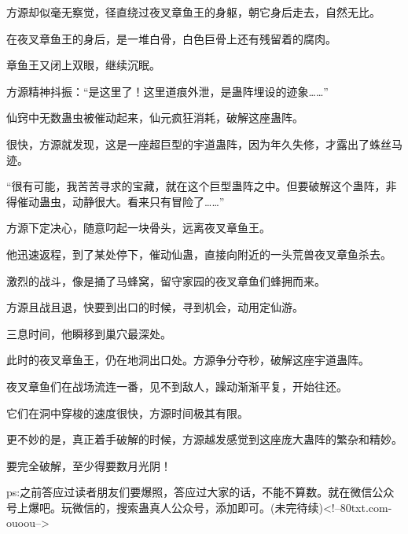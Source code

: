 \begin{this_body}
方源却似毫无察觉，径直绕过夜叉章鱼王的身躯，朝它身后走去，自然无比。

在夜叉章鱼王的身后，是一堆白骨，白色巨骨上还有残留着的腐肉。

章鱼王又闭上双眼，继续沉眠。

方源精神抖振：“是这里了！这里道痕外泄，是蛊阵埋设的迹象……”

仙窍中无数蛊虫被催动起来，仙元疯狂消耗，破解这座蛊阵。

很快，方源就发现，这是一座超巨型的宇道蛊阵，因为年久失修，才露出了蛛丝马迹。

“很有可能，我苦苦寻求的宝藏，就在这个巨型蛊阵之中。但要破解这个蛊阵，非得催动蛊虫，动静很大。看来只有冒险了……”

方源下定决心，随意叼起一块骨头，远离夜叉章鱼王。

他迅速返程，到了某处停下，催动仙蛊，直接向附近的一头荒兽夜叉章鱼杀去。

激烈的战斗，像是捅了马蜂窝，留守家园的夜叉章鱼们蜂拥而来。

方源且战且退，快要到出口的时候，寻到机会，动用定仙游。

三息时间，他瞬移到巢穴最深处。

此时的夜叉章鱼王，仍在地洞出口处。方源争分夺秒，破解这座宇道蛊阵。

夜叉章鱼们在战场流连一番，见不到敌人，躁动渐渐平复，开始往还。

它们在洞中穿梭的速度很快，方源时间极其有限。

更不妙的是，真正着手破解的时候，方源越发感觉到这座庞大蛊阵的繁杂和精妙。

要完全破解，至少得要数月光阴！

ps:之前答应过读者朋友们要爆照，答应过大家的话，不能不算数。就在微信公众号上爆吧。玩微信的，搜索蛊真人公众号，添加即可。(未完待续)<!--80txt.com-ouoou-->

\end{this_body}


